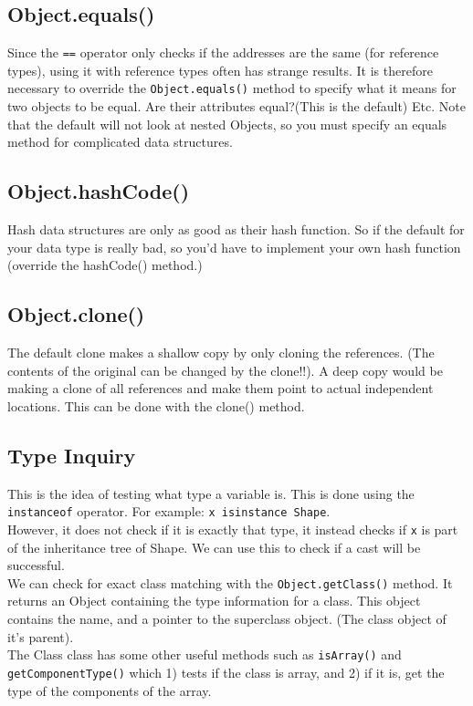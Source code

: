 \documentclass[12pt]{article}
\theoremstyle{definition}
\begin{document}
\subsection{Object.equals()}
Since the \texttt{==} operator only checks if the addresses are the same (for reference types), using it with reference types often has strange results. It is therefore necessary to override the \texttt{Object.equals()} method to specify what it means for two objects to be equal. Are their attributes equal?(This is the default) Etc. Note that the default will not look at nested Objects, so you must specify an equals method for complicated data structures.

\subsection{Object.hashCode()}
Hash data structures are only as good as their hash function. So if the default for your data type is really bad, so you'd have to implement your own hash function (override the hashCode() method.)

\subsection{Object.clone()}
The default clone makes a shallow copy by only cloning the references. (The contents of the original can be changed by the clone!!). A deep copy would be making a clone of all references and make them point to actual independent locations. This can be done with the clone() method.

\subsection{Type Inquiry}
This is the idea of testing what type a variable is. This is done using the \texttt{instanceof} operator. For example: \texttt{x isinstance Shape}.
\\ \linebreak
However, it does not check if it is exactly that type, it instead checks if \texttt{x} is part of the inheritance tree of Shape. We can use this to check if a cast will be successful.
\\ \linebreak
We can check for exact class matching with the \texttt{Object.getClass()} method. It returns an Object containing the type information for a class. This object contains the name, and a pointer to the superclass object. (The class object of it's parent).
\\ \linebreak
The Class class has some other useful methods such as \texttt{isArray()} and \texttt{getComponentType()} which 1) tests if the class is array, and 2) if it is, get the type of the components of the array.
\end{document}
